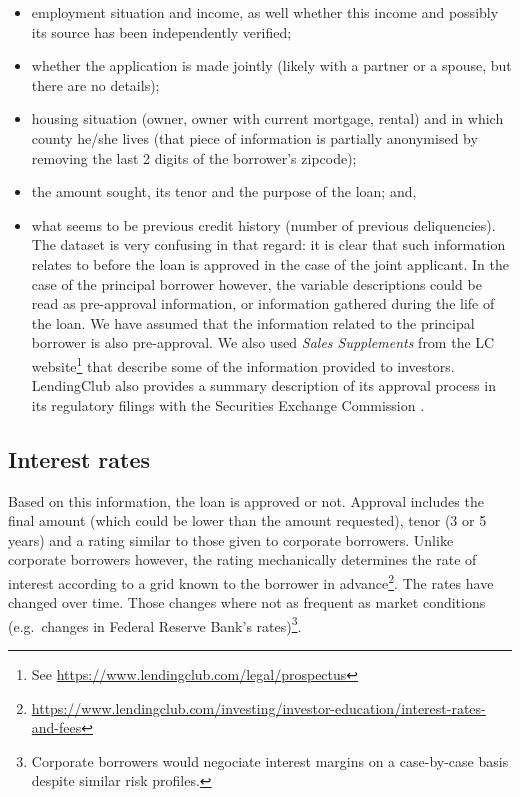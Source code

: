 \documentclass[11pt,]{report}
\let\rmarkdownfootnote\footnote%
\def\footnote{\protect\rmarkdownfootnote}
\begin{document}
\begin{itemize}
\item
  employment situation and income, as well whether this income and possibly its source has been independently verified;
\item
  whether the application is made jointly (likely with a partner or a spouse, but there are no details);
\item
  housing situation (owner, owner with current mortgage, rental) and in which county he/she lives (that piece of information is partially anonymised by removing the last 2 digits of the borrower's zipcode);
\item
  the amount sought, its tenor and the purpose of the loan; and,
\item
  what seems to be previous credit history (number of previous deliquencies). The dataset is very confusing in that regard: it is clear that such information relates to before the loan is approved in the case of the joint applicant. In the case of the principal borrower however, the variable descriptions could be read as pre-approval information, or information gathered during the life of the loan. We have assumed that the information related to the principal borrower is also pre-approval. We also used \emph{Sales Supplements} from the LC website\footnote{See \url{https://www.lendingclub.com/legal/prospectus}} that describe some of the information provided to investors. LendingClub also provides a summary description of its approval process in its regulatory filings with the Securities Exchange Commission \citep{LC201908S3}.
\end{itemize}

\hypertarget{interest-rates}{%
\subsection{Interest rates}\label{interest-rates}}

Based on this information, the loan is approved or not. Approval includes the final amount (which could be lower than the amount requested), tenor (3 or 5 years) and a rating similar to those given to corporate borrowers. Unlike corporate borrowers however, the rating mechanically determines the rate of interest according to a grid known to the borrower in advance\footnote{\url{https://www.lendingclub.com/investing/investor-education/interest-rates-and-fees}}. The rates have changed over time. Those changes where not as frequent as market conditions (e.g.~changes in Federal Reserve Bank's rates)\footnote{Corporate borrowers would negociate interest margins on a case-by-case basis despite similar risk profiles.}.
\end{document}
